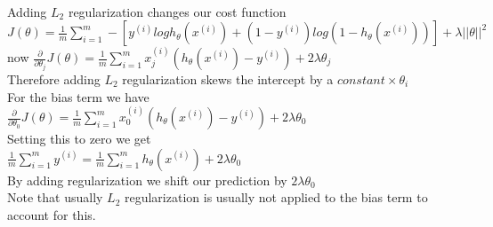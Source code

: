\begin{answer}\\
Adding $L_2$ regularization changes our cost function\\
$J(\theta)=\frac{1}{m}\sum_{i=1}^{m}-[y^{(i)}log h_{\theta}(x^{(i)})+(1-y^{(i)})log(1-h_{\theta}(x^{(i)}))] + \lambda||\theta||^2$\\
now $\frac{\partial}{\partial \theta_j}J(\theta)=\frac{1}{m}\sum_{i=1}^{m}x_j^{(i)}(h_{\theta}(x^{(i)})-y^{(i)})+2 \lambda \theta_j$\\
Therefore adding $L_2$ regularization skews the intercept by a $constant \times \theta_i$\\
For the bias term we have\\
$\frac{\partial}{\partial \theta_0}J(\theta)=\frac{1}{m}\sum_{i=1}^{m}x_0^{(i)}(h_{\theta}(x^{(i)})-y^{(i)})+2 \lambda \theta_0$\\
Setting this to zero we get\\
$\frac{1}{m}\sum_{i=1}^{m}y^{(i)}=\frac{1}{m}\sum_{i=1}^{m}h_{\theta}(x^{(i)}) + 2\lambda \theta_0$\\
By adding regularization we shift our prediction by $2\lambda \theta_0$\\
Note that usually $L_2$ regularization is usually not applied to the bias term to account for this.
\end{answer}
